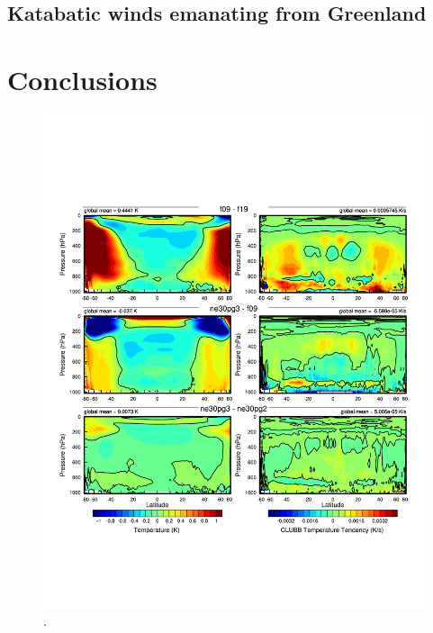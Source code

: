 \documentclass[draft]{agujournal2019}
\begin{document}
\subsection{Katabatic winds emanating from Greenland}

%
%
%
%

\section{Conclusions}\label{sec:conclusions}

\begin{figure}[t]
\begin{center}
         \includegraphics[width=130mm]{figs/temp_dhgt_panel_STEND_CLUBB-lores.pdf}
\end{center}
\caption{.}
\label{fig:dT-lores}
\end{figure}
\end{document}
